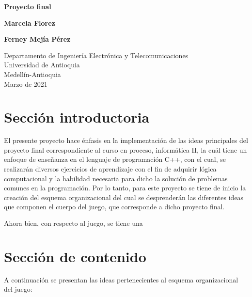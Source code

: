 \documentclass{article}
\begin{document}
\begin{titlepage}
    \begin{center}
        \vspace*{1cm}
            
        \Huge
        \textbf{Proyecto final}
            
        \vspace{0.5cm}
        \LARGE
            
            
        \vspace{1.5cm}
        
        \textbf{Marcela Florez} 
        
        \textbf{Ferney Mejía Pérez}
            
        \vfill
            
        \vspace{0.8cm}
            
        \Large
        Departamento de Ingeniería Electrónica y Telecomunicaciones\\
        Universidad de Antioquia\\
        Medellín-Antioquia\\
        Marzo de 2021
            
    \end{center}
\end{titlepage}

\tableofcontents
\newpage
\section{Sección introductoria}\label{intro}
El presente proyecto hace énfasis en la implementación de las ideas principales del proyecto final correspondiente al curso en proceso, informática II, la cuál tiene un enfoque de enseñanza en el lenguaje de programación C++, con el cual, se realizarán diversos ejercicios de aprendizaje con el fin de adquirir lógica computacional y la habilidad necesaria para dicho la solución de problemas comunes en la programación. Por lo tanto, para este proyecto se tiene de inicio la creación del esquema organizacional del cual se desprenderán las diferentes ideas que componen el cuerpo del juego, que corresponde a dicho proyecto final.

Ahora bien, con respecto al juego, se tiene una
\section{Sección de contenido} \label{contenido}
A continuación se presentan las ideas pertenecientes al esquema organizacional del juego:
\end{document}
